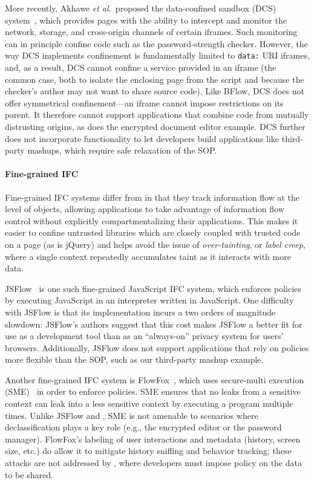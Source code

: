 More recently, Akhawe \emph{et al.}~proposed the data-confined
sandbox (DCS) system~\cite{Akhawe2013}, which provides pages with the
ability to intercept and monitor the network, storage, and cross-origin
channels of certain iframes.
%
Such monitoring can in principle confine code such as the
password-strength checker.
%
However, the way DCS implements confinement is fundamentally limited to \verb|data:|
URI iframes, and, as a result, DCS cannot confine a service provided
in an iframe (the common case, both to isolate the enclosing page from
the script and because the checker's author may not want to share
source code\cite{postman}).
%
Like BFlow, DCS does not offer symmetrical confinement---an iframe
cannot impose restrictions on its parent. It therefore cannot support
applications that combine code from mutually distrusting origins, as
does the encrypted document editor example.
%
DCS further does not incorporate functionality to let developers build
applications like third-party mashups, which require safe relaxation of the
SOP\@.

\paragraph{Fine-grained IFC}
Fine-grained IFC systems differ from \sys{} in that they track
information flow at the level of objects, allowing applications
to take advantage of information flow control without explicitly
compartmentalizing their applications. This makes it easier to
confine untrusted libraries which are closely coupled with trusted
code on a page (as is jQuery) and helps avoid the issue of
\emph{over-tainting}, or \emph{label creep},
where a single context repeatedly accumulates taint as it interacts
with more data.

JSFlow~\cite{JSFlow} is one such fine-grained JavaScript IFC system, which
enforces policies by executing JavaScript in an interpreter written in
JavaScript.
%
One difficulty with JSFlow is that
its implementation incurs a two orders of magnitude slowdown:
JSFlow's authors suggest that this cost makes JSFlow a better fit for use as a development tool than
as an ``always-on'' privacy system for users' browsers.
%
Additionally, JSFlow does not support applications that rely on policies
more flexible than the SOP, such as our third-party mashup example.

Another fine-grained IFC system is FlowFox~\cite{DeGroef:2012},
which uses secure-multi execution
(SME)~\cite{Devriese:2010} in order to enforce policies. SME ensures that no leaks
from a sensitive context can leak into a less sensitive context by
executing a program multiple times.
%
Unlike JSFlow and \sys{}, SME is not amenable to
scenarios where declassification plays a key role (e.g., the encrypted
editor or the password manager).
%
FlowFox's labeling of user interactions and metadata (history, screen
size, etc.) do allow it to mitigate history sniffing and behavior
tracking;
these attacks are not addressed by \sys{}, where developers must
impose policy on the data to be shared.

